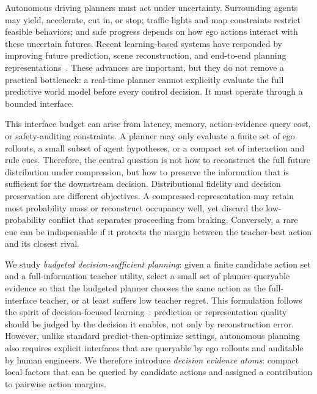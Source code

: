\documentclass{article}
\begin{document}
Autonomous driving planners must act under uncertainty. Surrounding agents may yield, accelerate, cut in, or stop; traffic lights and map constraints restrict feasible behaviors; and safe progress depends on how ego actions interact with these uncertain futures. Recent learning-based systems have responded by improving future prediction, scene reconstruction, and end-to-end planning representations~\cite{caesar2021nuplan,hu2023uniad,jiang2023vad,huang2023gameformer,huang2024dtpp,chen2024ppad,janner2022planning}. These advances are important, but they do not remove a practical bottleneck: a real-time planner cannot explicitly evaluate the full predictive world model before every control decision. It must operate through a bounded interface.

This interface budget can arise from latency, memory, action-evidence query cost, or safety-auditing constraints. A planner may only evaluate a finite set of ego rollouts, a small subset of agent hypotheses, or a compact set of interaction and rule cues. Therefore, the central question is not how to reconstruct the full future distribution under compression, but how to preserve the information that is sufficient for the downstream decision. Distributional fidelity and decision preservation are different objectives. A compressed representation may retain most probability mass or reconstruct occupancy well, yet discard the low-probability conflict that separates proceeding from braking. Conversely, a rare cue can be indispensable if it protects the margin between the teacher-best action and its closest rival.

We study \emph{budgeted decision-sufficient planning}: given a finite candidate action set and a full-information teacher utility, select a small set of planner-queryable evidence so that the budgeted planner chooses the same action as the full-interface teacher, or at least suffers low teacher regret. This formulation follows the spirit of decision-focused learning~\cite{mandi2023decisionfocused}: prediction or representation quality should be judged by the decision it enables, not only by reconstruction error. However, unlike standard predict-then-optimize settings, autonomous planning also requires explicit interfaces that are queryable by ego rollouts and auditable by human engineers. We therefore introduce \emph{decision evidence atoms}: compact local factors that can be queried by candidate actions and assigned a contribution to pairwise action margins.
\end{document}
